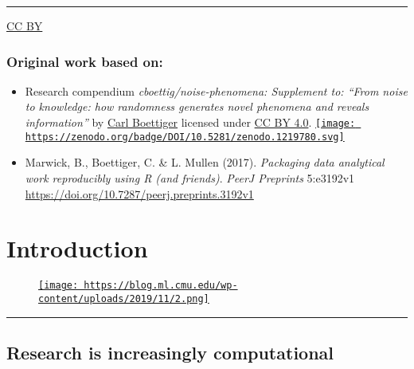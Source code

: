 \documentclass[
  letterpaper,
  DIV=11,
  numbers=noendperiod]{scrreprt}
\begin{document}
\begin{center}\rule{0.5\linewidth}{0.5pt}\end{center}

\href{http://creativecommons.org/licenses/by/4.0/}{CC BY}

\hypertarget{original-work-based-on}{%
\subsection{Original work based on:}\label{original-work-based-on}}

\begin{itemize}
\item
  Research compendium \emph{cboettig/noise-phenomena: Supplement to:
  ``From noise to knowledge: how randomness generates novel phenomena
  and reveals information''} by \href{https://github.com/cboettig}{Carl
  Boettiger} licensed under
  \href{https://creativecommons.org/licenses/by/4.0/}{CC BY 4.0}.
  \href{https://doi.org/10.5281/zenodo.1219780}{\texttt{[image: https://zenodo.org/badge/DOI/10.5281/zenodo.1219780.svg]}}
\item
  Marwick, B., Boettiger, C. \& L. Mullen (2017). \emph{Packaging data
  analytical work reproducibly using R (and friends)}. \emph{PeerJ
  Preprints} 5:e3192v1
  \url{https://doi.org/10.7287/peerj.preprints.3192v1}
\end{itemize}


\hypertarget{introduction}{%
\chapter*{Introduction}\label{introduction}}

\begin{figure}

{\centering 

\href{https://doi.org/10.1038/533452a}{\texttt{[image: https://blog.ml.cmu.edu/wp-content/uploads/2019/11/2.png]}}

}

\end{figure}

\begin{center}\rule{0.5\linewidth}{0.5pt}\end{center}

\hypertarget{research-is-increasingly-computational}{%
\section*{\texorpdfstring{\textbf{Research is increasingly
computational}}{Research is increasingly computational}}\label{research-is-increasingly-computational}}
\end{document}
